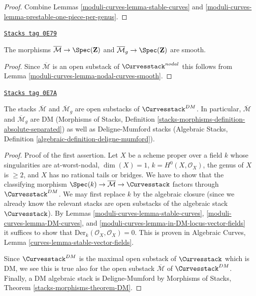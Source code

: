 \begin{proof}
Combine Lemmas \ref{moduli-curves-lemma-stable-curves} and
\ref{moduli-curves-lemma-prestable-one-piece-per-genus}.
\end{proof}

\begin{lemma}
\label{moduli-curves-lemma-stable-curves-smooth}
\href{https://stacks.math.columbia.edu/tag/0E79}{\texttt{Stacks tag 0E79}}

The morphisms
$\overline{\mathcal{M}} \to \Spec(\mathbf{Z})$ and
$\overline{\mathcal{M}}_g \to \Spec(\mathbf{Z})$
are smooth.
\end{lemma}

\begin{proof}
Since $\overline{\mathcal{M}}$ is an open substack of
$\Curvesstack^{nodal}$ this follows from
Lemma \ref{moduli-curves-lemma-nodal-curves-smooth}.
\end{proof}

\begin{lemma}
\label{moduli-curves-lemma-stable-curves-deligne-mumford}
\href{https://stacks.math.columbia.edu/tag/0E7A}{\texttt{Stacks tag 0E7A}}

The stacks $\overline{\mathcal{M}}$ and
$\overline{\mathcal{M}}_g$
are open substacks of $\Curvesstack^{DM}$.
In particular, $\overline{\mathcal{M}}$ and
$\overline{\mathcal{M}}_g$ are DM
(Morphisms of Stacks, Definition
\ref{stacks-morphisms-definition-absolute-separated})
as well as Deligne-Mumford stacks
(Algebraic Stacks, Definition \ref{algebraic-definition-deligne-mumford}).
\end{lemma}

\begin{proof}
Proof of the first assertion.
Let $X$ be a scheme proper over a field $k$ whose singularities
are at-worst-nodal, $\dim(X) = 1$, $k = H^0(X, \mathcal{O}_X)$,
the genus of $X$ is $\geq 2$, and $X$ has no rational tails or bridges.
We have to show that the classifying morphism
$\Spec(k) \to \overline{\mathcal{M}} \to \Curvesstack$
factors through $\Curvesstack^{DM}$.
We may first replace $k$ by the algebraic closure
(since we already know the relevant stacks are open
substacks of the algebraic stack $\Curvesstack$).
By Lemmas \ref{moduli-curves-lemma-stable-curves}, \ref{moduli-curves-lemma-DM-curves}, and
\ref{moduli-curves-lemma-in-DM-locus-vector-fields} it suffices to show that
$\text{Der}_k(\mathcal{O}_X, \mathcal{O}_X) = 0$.
This is proven in
Algebraic Curves, Lemma \ref{curves-lemma-stable-vector-fields}.

\medskip\noindent
Since $\Curvesstack^{DM}$ is the maximal open substack of
$\Curvesstack$ which is DM, we see this is true also for the
open substack $\overline{\mathcal{M}}$ of $\Curvesstack^{DM}$.
Finally, a DM algebraic stack is Deligne-Mumford by
Morphisms of Stacks, Theorem \ref{stacks-morphisms-theorem-DM}.
\end{proof}

